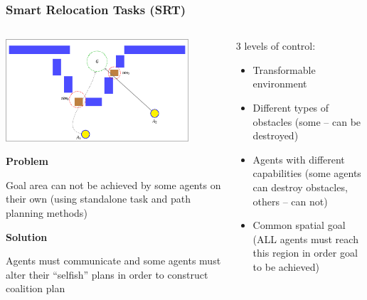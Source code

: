 \documentclass[default]{beamer}
\begin{document}
	\begin{frame}
		\frametitle{Smart Relocation Tasks (SRT)}
		
		\begin{columns}
			\begin{column}{0.55\textwidth}
				\begin{center}
					\includegraphics[page=1,width=0.85\textwidth]{examples/slides_colored}
				\end{center}
				
				\textbf{Problem}
				
				Goal area can not be achieved by some agents on their own (using standalone task and path planning methods)
				
				\textbf{Solution}
				
				Agents must communicate and some agents must alter their ``selfish'' plans in order to construct coalition plan
				
			\end{column}
			\begin{column}{0.45\textwidth}
				3 levels of control:
				\begin{itemize}
					\item Transformable environment
					\item Different types of obstacles (some -- can be destroyed)
					\item Agents with different capabilities (some agents can destroy obstacles, others -- can not)
					\item Common spatial goal (ALL agents must reach this region in order goal to be achieved)
				\end{itemize}
			\end{column}
		\end{columns}
	\end{frame}
\end{document}
